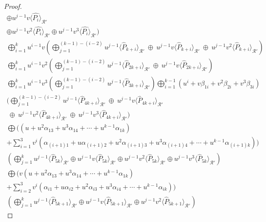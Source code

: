 \documentclass[10pt,a4paper]{amsart}
\begin{document}
\begin{proof}
\begin{gather*}
      \oplus  u^{j-1}v\langle \hat{P_i} \rangle_{\mathcal{R}'}
     \\ \oplus u^{j-1}v^2\langle \hat{P_i} \rangle_{\mathcal{R}'}
      \oplus  u^{j-1}v^3\langle \hat{P_i} \rangle_{\mathcal{R}'})
      \\ \bigoplus_{i=1}^{k} u^{i-1}v\left( \bigoplus_{j=1}^{(k-1)-(i-2)}  u^{j-1}\langle \hat{P}_{k+i} \rangle_{\mathcal{R}'}
      ~\oplus~  u^{j-1}v\langle \hat{P}_{k+i} \rangle_{\mathcal{R}'}
      ~\oplus~  u^{j-1}v^2\langle \hat{P}_{k+i} \rangle_{\mathcal{R}'}\right)
      \\ \bigoplus_{i=1}^{k} u^{i-1}v^2\left( \bigoplus_{j=1}^{(k-1)-(i-2)}  u^{j-1}\langle \hat{P}_{2k+i} \rangle_{\mathcal{R}'}
      ~\oplus~  u^{j-1}v\langle \hat{P}_{2k+i} \rangle_{\mathcal{R}'}\right)
      \\ \bigoplus_{i=1}^{k} u^{i-1}v^3\left( \bigoplus_{j=1}^{(k-1)-(i-2)}  u^{j-1}\langle \hat{P}_{3k+i} \rangle_{\mathcal{R}'}\right)
       \bigoplus_{i=1}^{k-1}  (u^i+ v\beta_{1i} + v^2\beta_{2i} + v^3\beta_{3i}) \\
      ( \bigoplus_{j=1}^{(k-1)-(i-2)}  u^{j-1}\langle \hat{P}_{4k+i} \rangle_{\mathcal{R}'}
      ~\oplus~  u^{j-1}v\langle \hat{P}_{4k+i} \rangle_{\mathcal{R}'}
      \\~\oplus~  u^{j-1}v^2\langle \hat{P}_{4k+i} \rangle_{\mathcal{R}'}
      ~\oplus~  u^{j-1}v^3\langle \hat{P}_{4k+i} \rangle_{\mathcal{R}'})
      \\  \bigoplus  ((u + u^2\alpha_{13} + u^3\alpha_{14} + \cdots + u^{k-1}\alpha_{1k})
     \\ + \sum_{i=1}^{3} v^i( \alpha_{(i+1)1} + u\alpha_{(i+1)2} + u^2\alpha_{(i+1)3} + u^3\alpha_{(i+1)4} + \cdots + u^{k-1}\alpha_{(i+1)k} )) \\ \left( \bigoplus_{j=1}^{k}  u^{j-1}\langle \hat{P}_{5k} \rangle_{\mathcal{R}'}
      \oplus  u^{j-1}v\langle \hat{P}_{5k} \rangle_{\mathcal{R}'}
      \oplus u^{j-1}v^2\langle \hat{P}_{5k} \rangle_{\mathcal{R}'}
      \oplus  u^{j-1}v^3\langle \hat{P}_{5k} \rangle_{\mathcal{R}'}\right)
     \\  \bigoplus   (v(u + u^2\alpha_{13} + u^3\alpha_{14} + \cdots + u^{k-1}\alpha_{1k})
     \\  + \sum_{i=2}^{3} v^i( \alpha_{i1} + u\alpha_{i2} + u^2\alpha_{i3} + u^3\alpha_{i4} + \cdots + u^{k-1}\alpha_{ik} )) \\
     \left( \bigoplus_{j=1}^{k}  u^{j-1}\langle \hat{P}_{5k+1} \rangle_{\mathcal{R}'}
      \oplus  u^{j-1}v\langle \hat{P}_{5k+1} \rangle_{\mathcal{R}'}
      \oplus  u^{j-1}v^2\langle \hat{P}_{5k+1} \rangle_{\mathcal{R}'}\right)

\end{gather*}
\end{proof}
\end{document}
